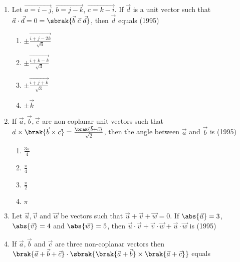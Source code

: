 \begin{enumerate}[label=\thesubsection.\arabic*.,ref=\thesubsection.\theenumi]
\item Let $\vec{a=i-j}$, $\vec{b=j-k}$, $\vec{c=k-i}$. If $\vec{d}$ is a unit vector such that $\vec{a}\cdot\vec{d} = 0 = \sbrak{\vec{b}\ \vec{c}\ \vec{d}}$, then $\vec{d}$ equals
\hfill (1995)
  \begin{multicols}{2}
\begin{enumerate}
\item $\pm \vec{\frac{{i+j-2k}}{\sqrt{6}}}$
\item $\pm \vec{\frac{{i+k-k}}{\sqrt{3}}}$
\item $\pm \vec{\frac{{i+j+k}}{\sqrt{3}}}$
\item $\pm \vec{k}$
\end{enumerate}
  \end{multicols}

\item If $\vec{a},\vec{b},\vec{c}$ are non coplanar unit vectors such that $\vec{a}\times\brak{\vec{b}\times\vec{c}} = \frac{\brak{\vec{b}+\vec{c}}}{\sqrt{2}}$, then the angle between $\vec{a}$ and $\vec{b}$ is
\hfill (1995)
  \begin{multicols}{2}
\begin{enumerate}
\item $\frac{3\pi}{4}$
\item $\frac{\pi}{4}$
\item $\frac{\pi}{2}$
\item $\pi$
\end{enumerate}
  \end{multicols}
  \item Let $\vec{u},\vec{v}$ and $\vec{w}$ be vectors such that $\vec{u}+\vec{v}+\vec{w} = 0$. If $\abs{\vec{u}}=3$, $\abs{\vec{v}}=4$ and $\abs{\vec{w}}=5$, then $\vec{u} \cdot \vec{v}+\vec{v} \cdot \vec{w}+\vec{u} \cdot \vec{w}$ is
  \hfill (1995)
 \begin{enumerate}
 \end{enumerate}   	
  \item If $\vec{a},\vec{b}$ and $\vec{c}$ are three non-coplanar vectors then 
  $\brak{\vec{a}+\vec{b}+\vec{c}} \cdot \sbrak{\brak{\vec{a}+\vec{b}} \times \brak{\vec{a}+\vec{c}}}$ equals


\end{enumerate}
